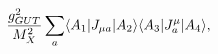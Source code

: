 \begin{equation}\label{gaugesum}
{g_{GUT}^2\over M_X^2}\sum_a\langle A_1|J_{\mu a}|A_2\rangle
\langle A_3| J^\mu_a|A_4\rangle,
\end{equation}

